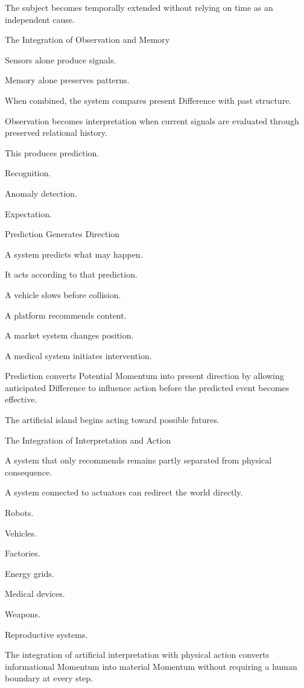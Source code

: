 The subject becomes temporally extended without relying on time as an independent cause.

The Integration of Observation and Memory

Sensors alone produce signals.

Memory alone preserves patterns.

When combined, the system compares present Difference with past structure.

Observation becomes interpretation when current signals are evaluated through preserved relational history.

This produces prediction.

Recognition.

Anomaly detection.

Expectation.

Prediction Generates Direction

A system predicts what may happen.

It acts according to that prediction.

A vehicle slows before collision.

A platform recommends content.

A market system changes position.

A medical system initiates intervention.

Prediction converts Potential Momentum into present direction by allowing anticipated Difference to influence action before the predicted event becomes effective.

The artificial island begins acting toward possible futures.

The Integration of Interpretation and Action

A system that only recommends remains partly separated from physical consequence.

A system connected to actuators can redirect the world directly.

Robots.

Vehicles.

Factories.

Energy grids.

Medical devices.

Weapons.

Reproductive systems.

The integration of artificial interpretation with physical action converts informational Momentum into material Momentum without requiring a human boundary at every step.

